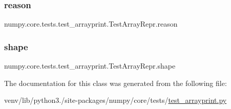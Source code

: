 \subsubsection{\texorpdfstring{reason}{reason}}
{\footnotesize\ttfamily numpy.\+core.\+tests.\+test\+\_\+arrayprint.\+Test\+Array\+Repr.\+reason\hspace{0.3cm}{\ttfamily [static]}}

\mbox{\label{classnumpy_1_1core_1_1tests_1_1test__arrayprint_1_1TestArrayRepr_a648d206ee0e05706a9f19a90577071c7}} 
\subsubsection{\texorpdfstring{shape}{shape}}
{\footnotesize\ttfamily numpy.\+core.\+tests.\+test\+\_\+arrayprint.\+Test\+Array\+Repr.\+shape}



The documentation for this class was generated from the following file\+:\begin{DoxyCompactItemize}
\item 
venv/lib/python3./site-\/packages/numpy/core/tests/\hyperlink{test__arrayprint_8py}{test\+\_\+arrayprint.\+py}\end{DoxyCompactItemize}
